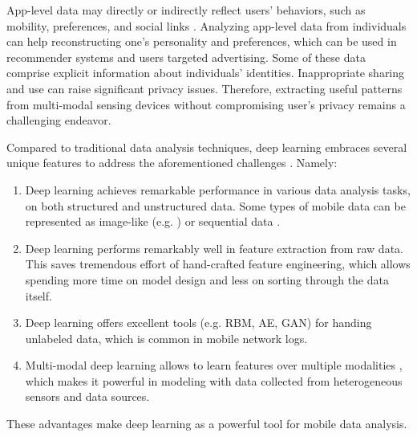 \documentclass[journal,comsoc,letter]{IEEEtran}
\begin{document}
App-level data may directly or indirectly reflect users' behaviors, such as mobility, preferences, and social links \cite{cheng2017mobile}. Analyzing app-level data from individuals can help reconstructing one's personality and preferences, which can be used in recommender systems and users targeted advertising. Some of these data comprise explicit information about individuals' identities. Inappropriate sharing and use can raise significant privacy issues. Therefore, extracting useful patterns from multi-modal sensing devices without compromising user's privacy remains a challenging endeavor.

Compared to traditional data analysis techniques, deep learning embraces several unique features to address the aforementioned challenges \cite{alsheikh2016mobile}. Namely:
\begin{enumerate}
\item Deep learning achieves remarkable performance in various data analysis tasks, on both structured and unstructured data. Some types of mobile data can be represented as image-like (e.g. \cite{chaoyun2017zipnet}) or sequential data \cite{liang2016mercury}.
\item Deep learning performs remarkably well in feature extraction from raw data. This saves tremendous effort of hand-crafted feature engineering, which allows spending more time on model design and less on sorting through the data itself.
\item Deep learning offers excellent tools (e.g. RBM, AE, GAN) for handing unlabeled data, which is common in mobile network logs. 
\item Multi-modal deep learning allows to learn features over multiple modalities \cite{ngiam2011multimodal}, which makes it powerful in modeling with data collected from heterogeneous sensors and data sources.
\end{enumerate}
These advantages make deep learning as a powerful tool for mobile data analysis.
\end{document}
